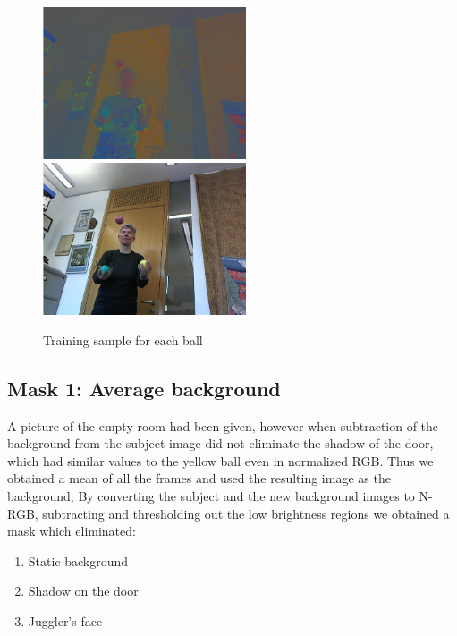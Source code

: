 \documentclass[10pt,a4paper,oneclumn]{article}
\begin{document}
\begin{figure}
\centering
  \includegraphics[width=6cm]{figures/imnrgb.png}
  \includegraphics[width=6cm]{figures/original.png}
\caption{Training sample for each ball}
\end{figure}

\subsection{Mask 1: Average background}

A picture of the empty room had been given, however when subtraction of the background from the subject image did not eliminate the shadow of the door, which had similar values to the yellow ball even in normalized RGB. Thus we obtained a mean of all the frames and used the resulting image as the background; By converting the subject and the new background images to N-RGB, subtracting and thresholding out the low brightness regions we obtained a mask which eliminated:
\begin{enumerate}
\item Static background
\item Shadow on the door
\item Juggler's face
\end{enumerate}
\end{document}
